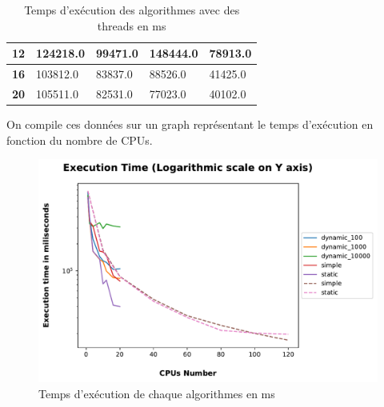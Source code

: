 \documentclass[12pt,a4paper,oneside, titlepage]{report}
\begin{document}
\begin{table}[H]
\begin{tabular}{c|l|l|l|l|}
				\multicolumn{1}{|c|}{\cellcolor[HTML]{EFEFEF}\textbf{12}} & 124218.0                                                           & 99471.0                                                             & 148444.0                                                     & 78913.0                                                      \\ \hline
				\multicolumn{1}{|c|}{\cellcolor[HTML]{EFEFEF}\textbf{16}} & 103812.0                                                           & 83837.0                                                             & 88526.0                                                      & 41425.0                                                      \\ \hline
				\multicolumn{1}{|c|}{\cellcolor[HTML]{EFEFEF}\textbf{20}} & 105511.0                                                           & 82531.0                                                             & 77023.0                                                      & 40102.0                                                      \\ \hline
			\end{tabular}
			\caption{Temps d'exécution des algorithmes avec des threads en ms}
		\end{table}

		\newpage

		On compile ces données sur un graph représentant le temps d'exécution en fonction du nombre de CPUs.

		\begin{figure}[H]
			\centering
			\includegraphics[scale=0.85]{graphs/execTime}
			\caption {Temps d'exécution de chaque algorithmes en ms}
		\end{figure}
\end{document}
